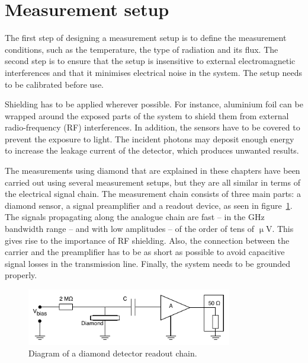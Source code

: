 \section{Measurement setup}
\label{sec:meassetup}
The first step of designing a measurement setup is to define the measurement conditions, such as the temperature, the type of radiation and its flux. The second step is to ensure that the setup is insensitive to external electromagnetic interferences and that it minimises electrical noise in the system. The setup needs to be calibrated before use. 

Shielding has to be applied wherever possible. For instance, aluminium foil can be wrapped around the exposed parts of the system to shield them from external radio-frequency (RF) interferences. In addition, the sensors have to be covered to prevent the exposure to light. The incident photons may deposit enough energy to increase the leakage current of the detector, which produces unwanted results.

The measurements using diamond that are explained in these chapters have been carried out using several measurement setups, but they are all similar in terms of the electrical signal chain. The measurement chain consists of three main parts: a diamond sensor, a signal preamplifier and a readout device, as seen in figure~\ref{fig:ro-chain}. The signals propagating along the analogue chain are fast -- in the GHz bandwidth range --  and with low amplitudes -- of the order of tens of $\upmu$V. This gives rise to the importance of RF shielding. Also, the connection between the carrier and the preamplifier has to be as short as possible to avoid capacitive signal losses in the transmission line. Finally, the system needs to be grounded properly.

\begin{figure}
\centering
\includegraphics[width=0.8\textwidth]{03_measurement_results/plots/ro-chain}
\caption{Diagram of a diamond detector readout chain.}
\label{fig:ro-chain}
\end{figure}


